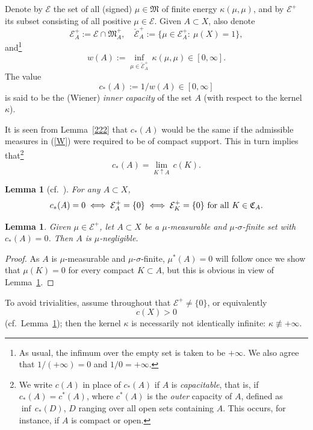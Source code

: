 \documentclass[12pt,a4paper,reqno]{amsart} %
\theoremstyle{lause}
\theoremstyle{maaritelma}
\theoremstyle{lause}
\newtheorem{lemma}[theorem]{Lemma}
\theoremstyle{maaritelma}
\numberwithin{equation}{section}
\begin{document}
Denote by $\mathcal E$ the set of all (signed) $\mu\in\mathfrak M$ of finite energy $\kappa(\mu,\mu)$, and by $\mathcal E^+$
its subset consisting of all positive $\mu\in\mathcal E$. Given $A\subset X$, also denote
\[\mathcal E^+_A:=\mathcal E\cap\mathfrak M^+_A,\quad\breve{\mathcal E}^+_A:=\bigl\{\mu\in\mathcal E^+_A: \ \mu(X)=1\bigr\},\]
and\footnote{As usual, the infimum over the empty set is taken to be $+\infty$. We also agree that $1/(+\infty)=0$ and $1/0 = +\infty$.\label{f1}}
\begin{equation}w(A):=\inf_{\mu\in\breve{\mathcal E}^+_A}\,\kappa(\mu,\mu)\in[0,\infty].\label{W}\end{equation}
The value \[c_*(A):=1/w(A)\in[0,\infty]\] is said to be the (Wiener) {\it inner capacity\/} of the set $A$ (with respect to the kernel $\kappa$).

It is seen from Lemma~\ref{222} that $c_*(A)$ would be the same if the admissible measures in (\ref{W})
were required to be of compact support. This in turn implies that\footnote{We write $c(A)$ in place of $c_*(A)$ if $A$ is {\it capacitable}, that is, if $c_*(A)=c^*(A)$, where $c^*(A)$ is the {\it outer\/} capacity of $A$, defined as $\inf\,c_*(D)$, $D$ ranging over all open sets containing $A$. This occurs, for instance, if $A$ is compact \cite[Lemma~2.3.4]{F1} or open.}
\begin{equation}\label{153}c_*(A)=\lim_{K\uparrow A}\,c(K).\end{equation}

\begin{lemma}[{\rm cf.\ \cite[Lemma~2.3.1]{F1}}]\label{l-negl1} For any\/ $A\subset X$, \[c_*(A)=0\iff\mathcal E^+_A=\{0\}\iff\mathcal E^+_K=\{0\}\text{\ for all\/ $K\in\mathfrak C_A$}.\]
\end{lemma}

\begin{lemma}\label{l-negl}Given\/ $\mu\in\mathcal E^+$, let\/ $A\subset X$ be a\/ $\mu$-mea\-sur\-ab\-le and\/ $\mu$-$\sigma$-fi\-ni\-te set with\/ $c_*(A)=0$. Then\/ $A$ is\/ $\mu$-neg\-lig\-ible.\end{lemma}

\begin{proof} As $A$ is $\mu$-mea\-sur\-ab\-le and $\mu$-$\sigma$-fi\-ni\-te, $\mu^*(A)=0$  will follow once we show that $\mu(K)=0$ for every compact $K\subset A$, but this is obvious in view of Lemma~\ref{l-negl1}.
\end{proof}

To avoid trivialities, assume throughout that $\mathcal E^+\ne\{0\}$, or equivalently
\begin{equation}\label{x0}c(X)>0\end{equation}
(cf.\ Lemma~\ref{l-negl1}); then the kernel $\kappa$ is necessarily not identically infinite: $\kappa\not\equiv+\infty$.
\end{document}
